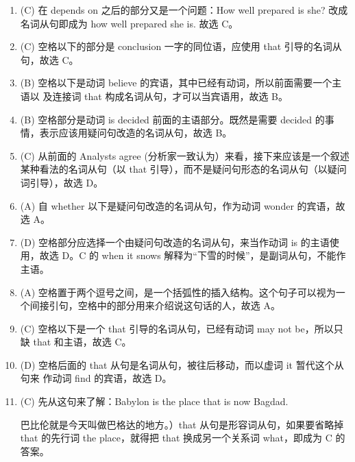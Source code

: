 \begin{enumerate}
\item  (C) 在 depends on 之后的部分又是一个问题：How well prepared is she? 改成名词从句即成为 how well prepared she is. 故选 C。

\item (C) 空格以下的部分是 conclusion 一字的同位语，应使用 that 引导的名词从句，故选 C。

\item (B) 空格以下是动词 believe 的宾语，其中已经有动词，所以前面需要一个主语以
  及连接词 that 构成名词从句，才可以当宾语用，故选 B。
\item (B) 空格部分是动词 is decided 前面的主语部分。既然是需要 decided 的事情，表示应该用疑问句改造的名词从句，故选 B。
\item (C) 从前面的 Analysts agree (分析家一致认为）来看，接下来应该是一个叙述某种看法的名词从句（以 that 引导），而不是疑问句形态的名词从句（以疑问词引导），故选 D。

\item  (A) 自 whether 以下是疑问句改造的名词从句，作为动词 wonder 的宾语，故选 A。

\item (D) 空格部分应选择一个由疑问句改造的名词从句，来当作动词 is 的主语使用，故选 D。C 的 when it snows 解释为“下雪的时候”，是副词从句，不能作主语。

\item (A) 空格置于两个逗号之间，是一个括弧性的插入结构。这个句子可以视为一个间接引句，空格中的部分用来介绍说这句话的人，故选 A。

\item (C) 空格以下是一个 that 引导的名词从句，已经有动词 may not be，所以只缺 that 和主语，故选 C。

\item (D) 空格后面的 that 从句是名词从句，被往后移动，而以虚词 it 暂代这个从句来
  作动词 find 的宾语，故选 D。

\item (C) 先从这句来了解：Babylon is the place that is now Bagdad.

  巴比伦就是今天叫做巴格达的地方。）that 从句是形容词从句，如果要省略掉 that
  的先行词 the place，就得把 that 换成另一个关系词 what，即成为 C 的答案。

\end{enumerate}


